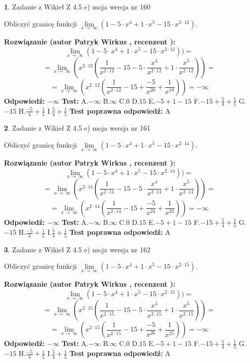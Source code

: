 \documentclass[12pt, a4paper]{article}
\theoremstyle{definition} %
\newtheorem{zad}{}
\newcommand{\zadStart}[1]{\begin{zad}#1\newline}
\newcommand{\zadStop}{\end{zad}}
\newcommand{\rozwStart}[2]{\noindent \textbf{Rozwiązanie (autor #1 , recenzent #2): }\newline}
\newcommand{\rozwStop}{\newline}
\newcommand{\odpStart}{\noindent \textbf{Odpowiedź:}\newline}
\newcommand{\odpStop}{\newline}
\newcommand{\testStart}{\noindent \textbf{Test:}\newline}
\newcommand{\testStop}{\newline}
\newcommand{\kluczStart}{\noindent \textbf{Test poprawna odpowiedź:}\newline}
\newcommand{\kluczStop}{\newline}
\begin{document}
\zadStart{Zadanie z Wikieł Z 4.5 e) moja wersja nr 160}



Obliczyć granicę funkcji  $\lim\limits_{x\to\ \infty}(1 - 5 \cdot x^{4}+1 \cdot x^{5}- 15 \cdot x^{2\cdot12})$.
\zadStop
\rozwStart{Patryk Wirkus}{}
$$\lim\limits_{x\to\ \infty}(1 - 5 \cdot x^{4}+1 \cdot x^{5}- 15 \cdot x^{2\cdot12}))=$$
$$=\lim\limits_{x\to\ \infty}(x^{2\cdot12}(\frac{1}{x^{2\cdot12}}-15 -5 \cdot \frac{x^{4}}{x^{2\cdot12}}+1 \cdot \frac{x^{5}}{x^{2\cdot12}}))=$$
$$=\lim\limits_{x\to\ \infty}(x^{2\cdot12}(\frac{1}{x^{2\cdot12}}-15 + \frac{-5}{x^{20}}+ \frac{1}{x^{19}}))=-\infty$$
\rozwStop
\odpStart
$-\infty$
\odpStop
\testStart
A.$-\infty$ B.$\infty$ C.$0$ D.$15$ E.$-5 + 1 - 15$
F.$-15+\frac{5}{4}+\frac{1}{5}$ G.$-15$
H.$\frac{-5}{4}+\frac{1}{5}$
I.$\frac{5}{4}+\frac{1}{5}$
\testStop
\kluczStart
A
\kluczStop



\zadStart{Zadanie z Wikieł Z 4.5 e) moja wersja nr 161}



Obliczyć granicę funkcji  $\lim\limits_{x\to\ \infty}(1 - 5 \cdot x^{4}+1 \cdot x^{5}- 15 \cdot x^{2\cdot14})$.
\zadStop
\rozwStart{Patryk Wirkus}{}
$$\lim\limits_{x\to\ \infty}(1 - 5 \cdot x^{4}+1 \cdot x^{5}- 15 \cdot x^{2\cdot14}))=$$
$$=\lim\limits_{x\to\ \infty}(x^{2\cdot14}(\frac{1}{x^{2\cdot14}}-15 -5 \cdot \frac{x^{4}}{x^{2\cdot14}}+1 \cdot \frac{x^{5}}{x^{2\cdot14}}))=$$
$$=\lim\limits_{x\to\ \infty}(x^{2\cdot14}(\frac{1}{x^{2\cdot14}}-15 + \frac{-5}{x^{24}}+ \frac{1}{x^{23}}))=-\infty$$
\rozwStop
\odpStart
$-\infty$
\odpStop
\testStart
A.$-\infty$ B.$\infty$ C.$0$ D.$15$ E.$-5 + 1 - 15$
F.$-15+\frac{5}{4}+\frac{1}{5}$ G.$-15$
H.$\frac{-5}{4}+\frac{1}{5}$
I.$\frac{5}{4}+\frac{1}{5}$
\testStop
\kluczStart
A
\kluczStop



\zadStart{Zadanie z Wikieł Z 4.5 e) moja wersja nr 162}



Obliczyć granicę funkcji  $\lim\limits_{x\to\ \infty}(1 - 5 \cdot x^{4}+1 \cdot x^{5}- 15 \cdot x^{2\cdot15})$.
\zadStop
\rozwStart{Patryk Wirkus}{}
$$\lim\limits_{x\to\ \infty}(1 - 5 \cdot x^{4}+1 \cdot x^{5}- 15 \cdot x^{2\cdot15}))=$$
$$=\lim\limits_{x\to\ \infty}(x^{2\cdot15}(\frac{1}{x^{2\cdot15}}-15 -5 \cdot \frac{x^{4}}{x^{2\cdot15}}+1 \cdot \frac{x^{5}}{x^{2\cdot15}}))=$$
$$=\lim\limits_{x\to\ \infty}(x^{2\cdot15}(\frac{1}{x^{2\cdot15}}-15 + \frac{-5}{x^{26}}+ \frac{1}{x^{25}}))=-\infty$$
\rozwStop
\odpStart
$-\infty$
\odpStop
\testStart
A.$-\infty$ B.$\infty$ C.$0$ D.$15$ E.$-5 + 1 - 15$
F.$-15+\frac{5}{4}+\frac{1}{5}$ G.$-15$
H.$\frac{-5}{4}+\frac{1}{5}$
I.$\frac{5}{4}+\frac{1}{5}$
\testStop
\kluczStart
A
\kluczStop
\end{document}
